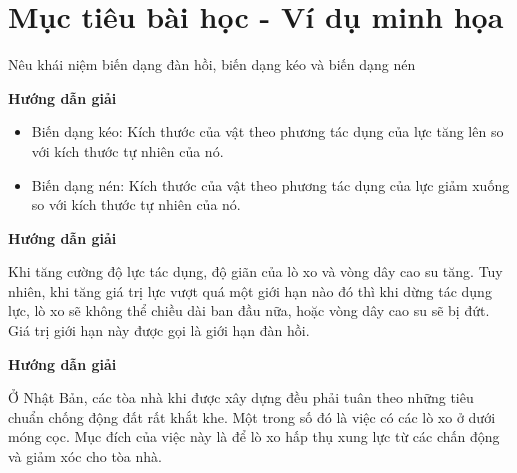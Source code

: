 \section{Mục tiêu bài học - Ví dụ minh họa}
\begin{dang}{Nêu khái niệm biến dạng đàn hồi, biến dạng kéo và biến dạng nén}
	{	\begin{center}
			\textbf{Hướng dẫn giải}
		\end{center}
		
		\begin{itemize}
			\item Biến dạng kéo: Kích thước của vật theo phương tác dụng của lực tăng lên so với kích thước tự nhiên của nó.
			
			\item Biến dạng nén: Kích thước của vật theo phương tác dụng của lực giảm xuống so với kích thước tự nhiên của nó.
		\end{itemize}
	}
	{	\begin{center}
			\textbf{Hướng dẫn giải}
		\end{center}
		
		Khi tăng cường độ lực tác dụng, độ giãn của lò xo và vòng dây cao su tăng. Tuy nhiên, khi tăng giá trị lực vượt quá một giới hạn nào đó thì khi dừng tác dụng lực, lò xo sẽ không thể chiều dài ban đầu nữa, hoặc vòng dây cao su sẽ bị đứt. Giá trị giới hạn này được gọi là giới hạn đàn hồi.
	}
	{	\begin{center}
			\textbf{Hướng dẫn giải}
		\end{center}
		
		Ở Nhật Bản, các tòa nhà khi được xây dựng đều phải tuân theo những tiêu chuẩn chống động đất rất khắt khe. Một trong số đó là việc có các lò xo ở dưới móng cọc. Mục đích của việc này là để lò xo hấp thụ xung lực từ các chấn động và giảm xóc cho tòa nhà.
	}
\end{dang}
